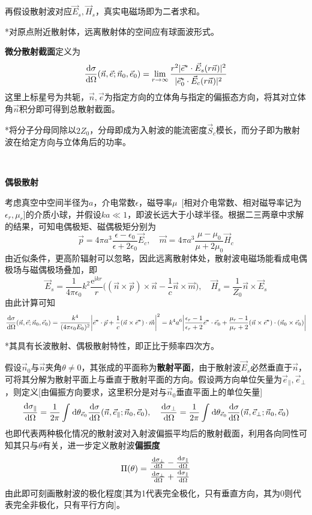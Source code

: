 \documentclass[a4paper,UTF8,fontset=windows]{ctexart}
\newcommand*{\dr}{\hspace{0.07em}\mathrm{d}}
\newcommand*{\er}{\mathrm{e}}
\newcommand*{\ir}{\mathrm{i}}
\newcommand*{\ve}{\vec{E}}
\newcommand*{\vh}{\vec{H}}
\newcommand*{\vs}{\vec{S}}
\newcommand*{\ves}{\vec{e}}
\newcommand*{\vms}{\vec{m}}
\newcommand*{\vns}{\vec{n}}
\newcommand*{\vps}{\vec{p}}
\newcommand*{\dt}[2][t]{\frac{\dr #2}{\dr #1}}
\begin{document}
再假设散射波对应$\ve_s,\vh_s$，真实电磁场即为二者求和。

*对原点附近散射体，远离散射体的空间应有球面波形式。

\textbf{微分散射截面}定义为
$$\dt[\Omega]{\sigma}(\vns,\ves;\vns_0,\ves_0)=\lim_{r\to\infty}\frac{r^2|\ves^*\cdot\ve_s(r\vns)|^2}{|\ves_0^*\cdot\ve_c(r\vns)|^2}$$
这里上标星号为共轭，$\vns,\ves$为指定方向的立体角与指定的偏振态方向，将其对立体角$\vns$积分即可得到总散射截面。

*将分子分母同除以$2Z_0$，分母即成为入射波的能流密度$\vs_c$模长，而分子即为散射波在给定方向与立体角后的功率。

\

\textbf{偶极散射}

考虑真空中空间半径为$a$，介电常数$\epsilon$，磁导率$\mu$\ [相对介电常数、相对磁导率记为$\epsilon_r,\mu_r$]的介质小球，并假设$ka\ll1$，即波长远大于小球半径。根据二三两章中求解的结果，可知电偶极矩、磁偶极矩分别为
$$\vps=4\pi a^3\frac{\epsilon-\epsilon_0}{\epsilon+2\epsilon_0}\ve_c,\quad\vms=4\pi a^3\frac{\mu-\mu_0}{\mu+2\mu_0}\vh_c$$
由近似条件，更高阶辐射可以忽略，因此远离散射体处，散射波电磁场能看成电偶极场与磁偶极场叠加，即
$$\ve_s=\frac{1}{4\pi\epsilon_0}k^2\frac{\er^{\ir kr}}{r}\bigg((\vns\times\vps)\times\vns-\frac{1}{c}\vns\times\vms\bigg),\quad\vh_s=\frac{1}{Z_0}\vns\times\ve_s$$
由此计算可知
$$\dt[\Omega]{\sigma}(\vns,\ves;\vns_0,\ves_0)=\frac{k^4}{(4\pi\epsilon_0E_0)^2}\bigg|\ves^*\cdot\vps+\frac{1}{c}(\vns\times\ves^*)\cdot\vms\bigg|^2=k^4a^6\bigg|\frac{\epsilon_r-1}{\epsilon_r+2}\ves^*\cdot\ves_0+\frac{\mu_r-1}{\mu_r+2}(\vns\times\ves^*)\cdot(\vns_0\times\ves_0)\bigg|$$

*其具有长波散射、偶极散射特性，即正比于频率四次方。

假设$\vns_0$与$\vns$夹角$\theta\ne0$，其张成的平面称为\textbf{散射平面}，由于散射波$\ve_s$必然垂直于$\vns$，可将其分解为散射平面上与垂直于散射平面的方向。假设两方向单位矢量为$\ves_\parallel,\ves_\bot$，则定义[由偏振方向要求，这里积分是对与$\vns_0$垂直平面上的单位矢量]
$$\dt[\Omega]{\sigma_\parallel}=\frac{1}{2\pi}\int\dr\theta_{\ves_0}\dt[\Omega]\sigma(\vns,\ves_\parallel;\vns_0,\ves_0),\quad\dt[\Omega]{\sigma_\bot}=\frac{1}{2\pi}\int\dr\theta_{\ves_0}\dt[\Omega]\sigma(\vns,\ves_\bot;\vns_0,\ves_0)$$
也即代表两种极化情况的散射波对入射波偏振平均后的散射截面，利用各向同性可知其只与$\theta$有关，进一步定义散射波\textbf{偏振度}
$$\Pi(\theta)=\frac{\dt[\Omega]{\sigma_\bot}-\dt[\Omega]{\sigma_\parallel}}{\dt[\Omega]{\sigma_\bot}+\dt[\Omega]{\sigma_\parallel}}$$
由此即可刻画散射波的极化程度[其为1代表完全极化，只有垂直方向，其为0则代表完全非极化，只有平行方向]。
\end{document}
